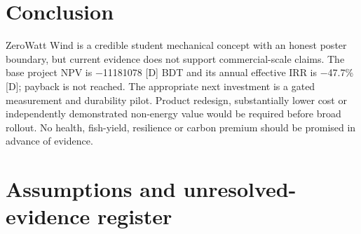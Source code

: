 \documentclass[11pt,a4paper]{article}
\begin{document}
\clearpage\section{Conclusion}
ZeroWatt Wind is a credible student mechanical concept with an honest poster boundary, but current evidence does not support commercial-scale claims. The base project NPV is \num{-11181078} [D] BDT and its annual effective IRR is \num{-47.7}\% [D]; payback is not reached. The appropriate next investment is a gated measurement and durability pilot. Product redesign, substantially lower cost or independently demonstrated non-energy value would be required before broad rollout. No health, fish-yield, resilience or carbon premium should be promised in advance of evidence.

\clearpage\section{Assumptions and unresolved-evidence register}
\end{document}
